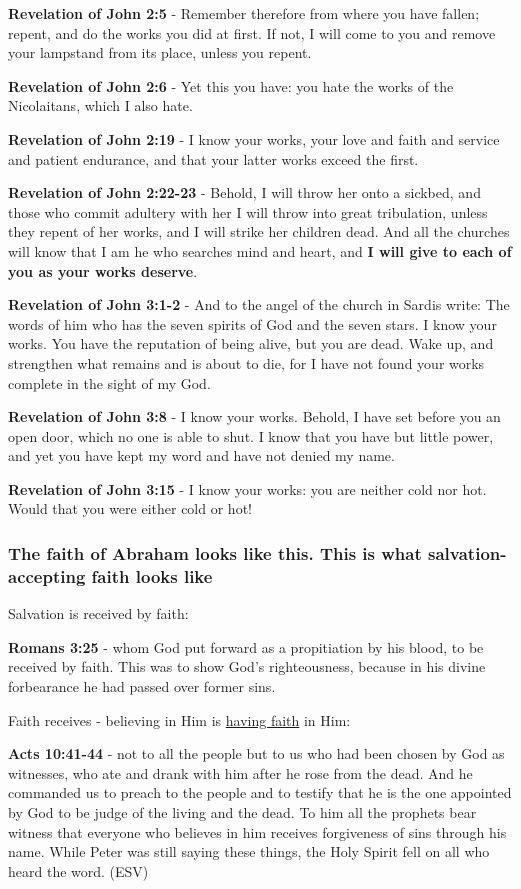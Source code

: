 \documentclass[11pt]{article}
\begin{document}
\textbf{Revelation of John 2:5} - Remember therefore from where you have fallen; repent, and do the works you did at first. If not, I will come to you and remove your lampstand from its place, unless you repent.

\textbf{Revelation of John 2:6} - Yet this you have: you hate the works of the Nicolaitans, which I also hate.

\textbf{Revelation of John 2:19} - I know your works, your love and faith and service and patient endurance, and that your latter works exceed the first.

\textbf{Revelation of John 2:22-23} - Behold, I will throw her onto a sickbed, and those who commit adultery with her I will throw into great tribulation, unless they repent of her works, and I will strike her children dead. And all the churches will know that I am he who searches mind and heart, and \textbf{I will give to each of you as your works deserve}.

\textbf{Revelation of John 3:1-2} - And to the angel of the church in Sardis write: The words of him who has the seven spirits of God and the seven stars. I know your works. You have the reputation of being alive, but you are dead. Wake up, and strengthen what remains and is about to die, for I have not found your works complete in the sight of my God.

\textbf{Revelation of John 3:8} - I know your works. Behold, I have set before you an open door, which no one is able to shut. I know that you have but little power, and yet you have kept my word and have not denied my name.

\textbf{Revelation of John 3:15} - I know your works: you are neither cold nor hot. Would that you were either cold or hot!

\subsubsection{The faith of Abraham looks like this. This is what salvation-accepting faith looks like}
\label{sec:org2faaf9b}
Salvation is received by faith:

\textbf{Romans 3:25} - whom God put forward as a propitiation by his blood, to be received by faith. This was to show God's righteousness, because in his divine forbearance he had passed over former sins.

Faith receives - believing in Him is \uline{having faith} in Him:

\textbf{Acts 10:41-44} - not to all the people but to us who had been chosen by God as witnesses, who ate and drank with him after he rose from the dead. And he commanded us to preach to the people and to testify that he is the one appointed by God to be judge of the living and the dead. To him all the prophets bear witness that everyone who believes in him receives forgiveness of sins through his name. While Peter was still saying these things, the Holy Spirit fell on all who heard the word. (ESV)
\end{document}
